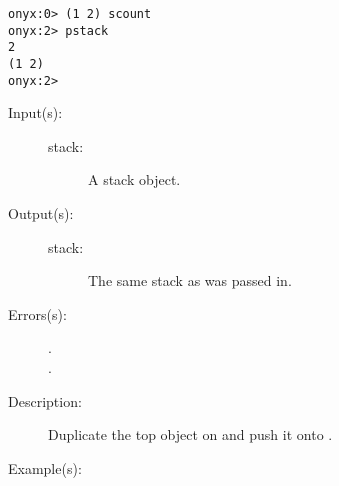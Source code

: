 \begin{description}
\begin{description}
\begin{verbatim}
onyx:0> (1 2) scount
onyx:2> pstack
2
(1 2)
onyx:2>
		\end{verbatim}
	\end{description}
\label{systemdict:sdup}
\item[{\onyxop{stack}{sdup}{stack}}: ]
	\begin{description}\item[]
	\item[Input(s): ]
		\begin{description}\item[]
		\item[stack: ]
			A stack object.
		\end{description}
	\item[Output(s): ]
		\begin{description}\item[]
		\item[stack: ]
			The same stack as was passed in.
		\end{description}
	\item[Errors(s): ]
		\begin{description}\item[]
		\item[.]
		\item[.]
		\end{description}
	\item[Description: ]
		Duplicate the top object on  and push it onto
		.
	\item[Example(s): ]\begin{verbatim}


\end{verbatim}
\end{description}
\end{description}
